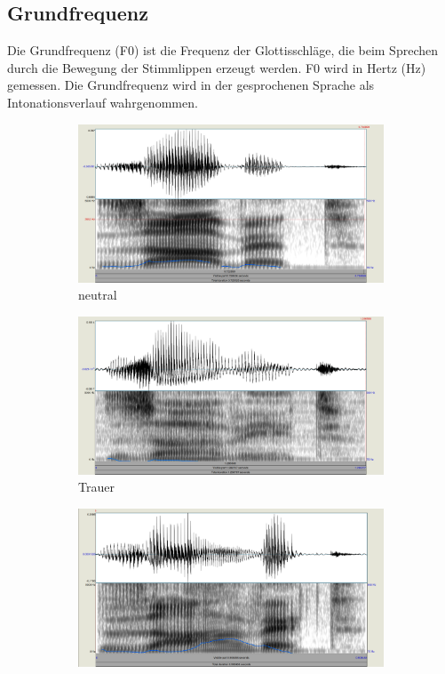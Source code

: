 \documentclass[11pt,a4paper,headsepline,twoside,toc=bibliography]{scrreprt}
\begin{document}
\subsection{Grundfrequenz}

Die Grundfrequenz (F0) ist die Frequenz der Glottisschläge, die beim Sprechen durch die Bewegung der Stimmlippen erzeugt werden. F0 wird in Hertz (Hz) gemessen. Die Grundfrequenz wird in der gesprochenen Sprache als Intonationsverlauf wahrgenommen. 

\begin{figure}
	\centering
	\begin{subfigure}{1\textwidth}
		\centering
		\includegraphics[width=0.8\linewidth]{pics/sawet_s.png}
		\caption{neutral}
		\label{fig:sawet_s}
	\end{subfigure}
	\par\bigskip
	\begin{subfigure}{0.8\textwidth}
		\centering
		\includegraphics[width=1\linewidth]{pics/sawet_T.png}
		\caption{Trauer}
		\label{fig:sawet_T}
	\end{subfigure}
	\par\bigskip
	\begin{subfigure}{0.8\textwidth}
		\centering
		\includegraphics[width=1\linewidth]{pics/sawet_F.png}

\end{subfigure}
\end{figure}
\end{document}
